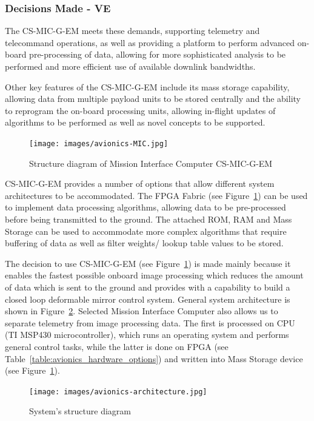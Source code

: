 \documentclass[12pt]{article}
\begin{document}
\subsubsection{Decisions Made - VE}

The CS-MIC-G-EM meets these demands, supporting telemetry and telecommand operations, as well as providing a platform to perform advanced on-board pre-processing of data, allowing for more sophisticated analysis to be performed and more efficient use of available downlink bandwidths. 

Other key features of the CS-MIC-G-EM include its mass storage capability, allowing data from multiple payload units to be stored centrally and the ability to reprogram the on-board processing units, allowing in-flight updates of algorithms to be performed as well as novel concepts to be supported.

\begin{figure}[ht]
\centering
  \texttt{[image: images/avionics-MIC.jpg]}
\caption{Structure diagram of Mission Interface Computer CS-MIC-G-EM  \cite{avionics_clyde_space}}
\label{fig:avionics_MIC}
\end{figure}

CS-MIC-G-EM provides a number of options that allow different system architectures to be accommodated. The FPGA Fabric (see Figure~\ref{fig:avionics_MIC}) can be used to implement data processing algorithms, allowing data to be pre-processed before being transmitted to the ground. The attached ROM, RAM and Mass Storage can be used to accommodate more complex algorithms that require buffering of data as well as filter weights/ lookup table values to be stored.

The decision to use CS-MIC-G-EM (see Figure~\ref{fig:avionics_MIC}) is made mainly because it enables the fastest possible onboard image processing \cite{avionics_FPGA} which reduces the amount of data which is sent to the ground and provides with a capability to build a closed loop deformable mirror control system.
General system architecture is shown in Figure~\ref{fig:avionics_architecture}. Selected Mission Interface Computer also allows us to separate telemetry from image processing data. The first is processed on CPU (TI MSP430 microcontroller), which runs an operating system and performs general control tasks, while the latter is done on FPGA (see Table~\ref{table:avionics_hardware_options}) and written into Mass Storage device (see Figure~\ref{fig:avionics_MIC}).

\begin{figure}[ht]
\centering
  \texttt{[image: images/avionics-architecture.jpg]}
\caption{System's structure diagram}
\label{fig:avionics_architecture}
\end{figure}
\end{document}
